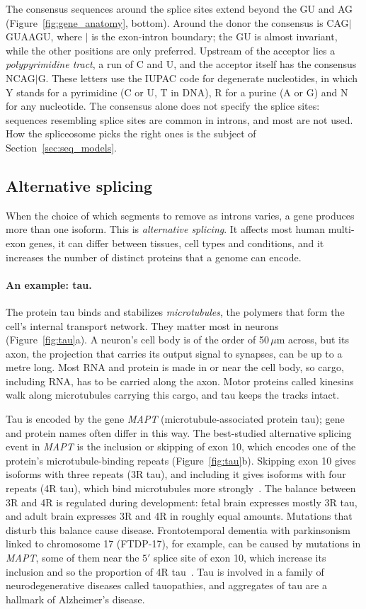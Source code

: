The consensus sequences around the splice sites extend beyond the GU and AG (Figure~\ref{fig:gene_anatomy}, bottom). Around the donor the consensus is CAG$|$GUAAGU, where $|$ is the exon-intron boundary; the GU is almost invariant, while the other positions are only preferred. Upstream of the acceptor lies a \emph{polypyrimidine tract}, a run of C and U, and the acceptor itself has the consensus NCAG$|$G. These letters use the IUPAC code for degenerate nucleotides, in which Y stands for a pyrimidine (C or U, T in DNA), R for a purine (A or G) and N for any nucleotide. The consensus alone does not specify the splice sites: sequences resembling splice sites are common in introns, and most are not used. How the spliceosome picks the right ones is the subject of Section~\ref{sec:seq_models}.

\subsection{Alternative splicing}

When the choice of which segments to remove as introns varies, a gene produces more than one isoform. This is \emph{alternative splicing}. It affects most human multi-exon genes, it can differ between tissues, cell types and conditions, and it increases the number of distinct proteins that a genome can encode.

\paragraph{An example: tau.} The protein tau binds and stabilizes \emph{microtubules}, the polymers that form the cell's internal transport network. They matter most in neurons (Figure~\ref{fig:tau}a). A neuron's cell body is of the order of 50\,$\mu$m across, but its axon, the projection that carries its output signal to synapses, can be up to a metre long. Most RNA and protein is made in or near the cell body, so cargo, including RNA, has to be carried along the axon. Motor proteins called kinesins walk along microtubules carrying this cargo, and tau keeps the tracks intact.

Tau is encoded by the gene \textit{MAPT} (microtubule-associated protein tau); gene and protein names often differ in this way. The best-studied alternative splicing event in \textit{MAPT} is the inclusion or skipping of exon 10, which encodes one of the protein's microtubule-binding repeats (Figure~\ref{fig:tau}b). Skipping exon 10 gives isoforms with three repeats (3R tau), and including it gives isoforms with four repeats (4R tau), which bind microtubules more strongly~\citep{goedert1989}. The balance between 3R and 4R is regulated during development: fetal brain expresses mostly 3R tau, and adult brain expresses 3R and 4R in roughly equal amounts. Mutations that disturb this balance cause disease. Frontotemporal dementia with parkinsonism linked to chromosome 17 (FTDP-17), for example, can be caused by mutations in \textit{MAPT}, some of them near the $5'$ splice site of exon 10, which increase its inclusion and so the proportion of 4R tau~\citep{hutton1998}. Tau is involved in a family of neurodegenerative diseases called tauopathies, and aggregates of tau are a hallmark of Alzheimer's disease.

